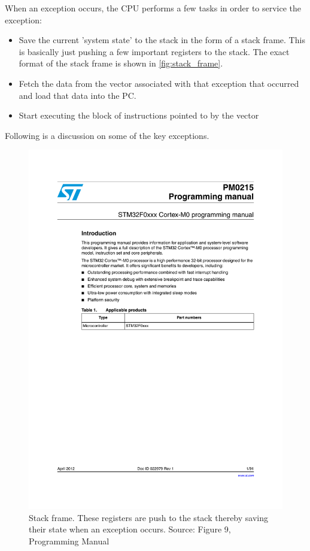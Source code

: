 When an exception occurs, the CPU performs a few tasks in order to service the exception:
\begin{itemize}
    \item Save the current 'system state' to the stack in the form of a stack frame. This is basically just pushing a few important registers to the stack. The exact format of the stack frame is shown in \autoref{fig:stack_frame}.
    \item Fetch the data from the vector associated with that exception that occurred and load that data into the PC.
    \item Start executing the block of instructions pointed to by the vector
\end{itemize}

Following is a discussion on some of the key exceptions.

\begin{figure}
\centering
\includegraphics[page=26, clip=true, trim=135 315 100 410, width=\textwidth]{./stm32f0xx_programming_manual}
\caption{Stack frame. These registers are push to the stack thereby saving their state when an exception occurs. Source: Figure 9, Programming Manual}
\label{fig:stack_frame}
\end{figure}

